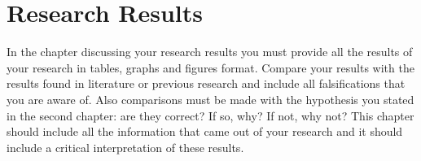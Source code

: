 \chapter{Research Results}\label{chap:research_results}

In the chapter discussing your research results you must provide all the results of your research in tables, graphs and figures format. Compare your results with the results found in literature or previous research and include all falsifications that you are aware of. Also comparisons must be made with the hypothesis you stated in the second chapter: are they correct? If so, why? If not, why not?
This chapter should include all the information that came out of your research and it should include a critical interpretation of these results.

